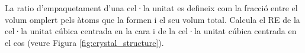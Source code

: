 \begin{exr}
La ratio d'empaquetament d'una cel·la unitat es defineix com la fracció entre el volum omplert pels àtoms que la formen i el seu volum total. Calcula el RE de la cel·la unitat cúbica centrada en la cara i de la cel·la unitat cúbica centrada en el cos (veure Figura \ref{fig:crystal_structure}).
\end{exr}